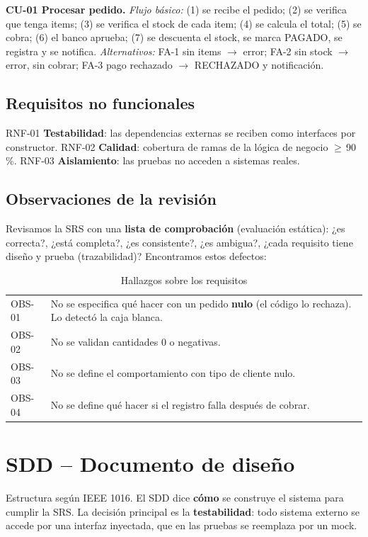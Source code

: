 \documentclass[11pt,a4paper,oneside]{report}
\begin{document}
\textbf{CU-01 Procesar pedido.} \emph{Flujo básico:} (1) se recibe el pedido; (2) se verifica que tenga items; (3) se verifica el stock de cada item; (4) se calcula el total; (5) se cobra; (6) el banco aprueba; (7) se descuenta el stock, se marca PAGADO, se registra y se notifica. \emph{Alternativos:} FA-1 sin items $\rightarrow$ error; FA-2 sin stock $\rightarrow$ error, sin cobrar; FA-3 pago rechazado $\rightarrow$ RECHAZADO y notificación.

\section{Requisitos no funcionales}
RNF-01 \textbf{Testabilidad}: las dependencias externas se reciben como interfaces por constructor. RNF-02 \textbf{Calidad}: cobertura de ramas de la lógica de negocio $\geq$\,90\,\%. RNF-03 \textbf{Aislamiento}: las pruebas no acceden a sistemas reales.

\section{Observaciones de la revisión}
\label{sec:revision}
Revisamos la SRS con una \textbf{lista de comprobación} (evaluación estática): ¿es correcta?, ¿está completa?, ¿es consistente?, ¿es ambigua?, ¿cada requisito tiene diseño y prueba (trazabilidad)? Encontramos estos defectos:
\begin{table}[H]
\centering
\caption{Hallazgos sobre los requisitos}
\small
\begin{tabularx}{\linewidth}{lX}
\toprule
OBS-01 & No se especifica qué hacer con un pedido \textbf{nulo} (el código lo rechaza). Lo detectó la caja blanca.\\
OBS-02 & No se validan cantidades 0 o negativas.\\
OBS-03 & No se define el comportamiento con tipo de cliente nulo.\\
OBS-04 & No se define qué hacer si el registro falla después de cobrar.\\
\bottomrule
\end{tabularx}
\end{table}

\chapter{SDD -- Documento de diseño}
\label{cap:sdd}
Estructura según IEEE 1016. El SDD dice \textbf{cómo} se construye el sistema para cumplir la SRS. La decisión principal es la \textbf{testabilidad}: todo sistema externo se accede por una interfaz inyectada, que en las pruebas se reemplaza por un mock.
\end{document}

